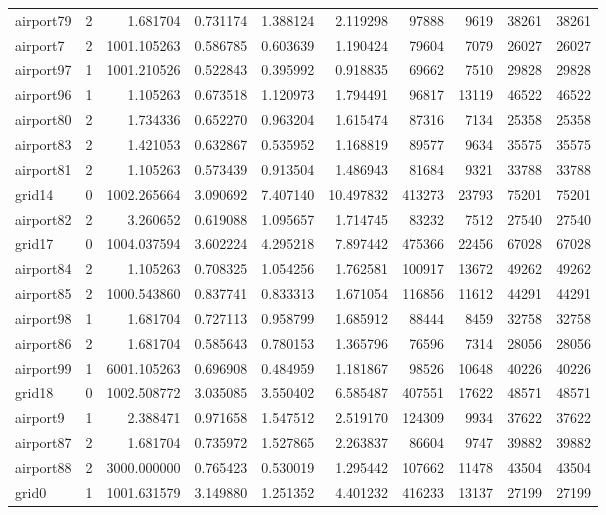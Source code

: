 \documentclass[../../../thesis.tex]{subfiles}
\begin{document}
\begin{longtable}{|l|r|r|r|r|r|r|r|r|r|}
airport79 & 2 & 1.681704 & 0.731174 & 1.388124 & 2.119298 & 97888 & 9619 & 38261 & 38261 \\
airport7 & 2 & 1001.105263 & 0.586785 & 0.603639 & 1.190424 & 79604 & 7079 & 26027 & 26027 \\
airport97 & 1 & 1001.210526 & 0.522843 & 0.395992 & 0.918835 & 69662 & 7510 & 29828 & 29828 \\
airport96 & 1 & 1.105263 & 0.673518 & 1.120973 & 1.794491 & 96817 & 13119 & 46522 & 46522 \\
airport80 & 2 & 1.734336 & 0.652270 & 0.963204 & 1.615474 & 87316 & 7134 & 25358 & 25358 \\
airport83 & 2 & 1.421053 & 0.632867 & 0.535952 & 1.168819 & 89577 & 9634 & 35575 & 35575 \\
airport81 & 2 & 1.105263 & 0.573439 & 0.913504 & 1.486943 & 81684 & 9321 & 33788 & 33788 \\
grid14 & 0 & 1002.265664 & 3.090692 & 7.407140 & 10.497832 & 413273 & 23793 & 75201 & 75201 \\
airport82 & 2 & 3.260652 & 0.619088 & 1.095657 & 1.714745 & 83232 & 7512 & 27540 & 27540 \\
grid17 & 0 & 1004.037594 & 3.602224 & 4.295218 & 7.897442 & 475366 & 22456 & 67028 & 67028 \\
airport84 & 2 & 1.105263 & 0.708325 & 1.054256 & 1.762581 & 100917 & 13672 & 49262 & 49262 \\
airport85 & 2 & 1000.543860 & 0.837741 & 0.833313 & 1.671054 & 116856 & 11612 & 44291 & 44291 \\
airport98 & 1 & 1.681704 & 0.727113 & 0.958799 & 1.685912 & 88444 & 8459 & 32758 & 32758 \\
airport86 & 2 & 1.681704 & 0.585643 & 0.780153 & 1.365796 & 76596 & 7314 & 28056 & 28056 \\
airport99 & 1 & 6001.105263 & 0.696908 & 0.484959 & 1.181867 & 98526 & 10648 & 40226 & 40226 \\
grid18 & 0 & 1002.508772 & 3.035085 & 3.550402 & 6.585487 & 407551 & 17622 & 48571 & 48571 \\
airport9 & 1 & 2.388471 & 0.971658 & 1.547512 & 2.519170 & 124309 & 9934 & 37622 & 37622 \\
airport87 & 2 & 1.681704 & 0.735972 & 1.527865 & 2.263837 & 86604 & 9747 & 39882 & 39882 \\
airport88 & 2 & 3000.000000 & 0.765423 & 0.530019 & 1.295442 & 107662 & 11478 & 43504 & 43504 \\
grid0 & 1 & 1001.631579 & 3.149880 & 1.251352 & 4.401232 & 416233 & 13137 & 27199 & 27199 \\

\end{longtable}
\end{document}

